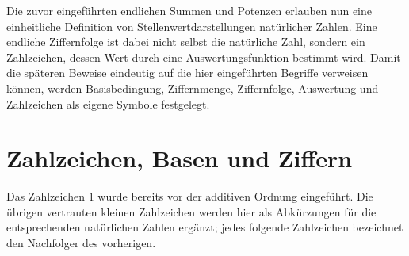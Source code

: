 \documentclass[main.tex]{subfiles}
\begin{document}
Die zuvor eingeführten endlichen Summen und Potenzen erlauben nun eine
einheitliche Definition von Stellenwertdarstellungen natürlicher Zahlen. Eine
endliche Ziffernfolge ist dabei nicht selbst die natürliche Zahl, sondern ein
Zahlzeichen, dessen Wert durch eine Auswertungsfunktion bestimmt wird. Damit
die späteren Beweise eindeutig auf die hier eingeführten Begriffe verweisen
können, werden Basisbedingung, Ziffernmenge, Ziffernfolge, Auswertung und
Zahlzeichen als eigene Symbole festgelegt.

\section{Zahlzeichen, Basen und Ziffern}

Das Zahlzeichen \(1\) wurde bereits vor der additiven Ordnung eingeführt.
Die übrigen vertrauten kleinen Zahlzeichen werden hier als Abkürzungen für
die entsprechenden natürlichen Zahlen ergänzt; jedes folgende Zahlzeichen
bezeichnet den Nachfolger des vorherigen.


\noindent\begin{minipage}{\linewidth}
\end{minipage}\par
\begin{tabproof}
\end{tabproof}

\begin{tabproof}
\end{tabproof}
\end{document}
